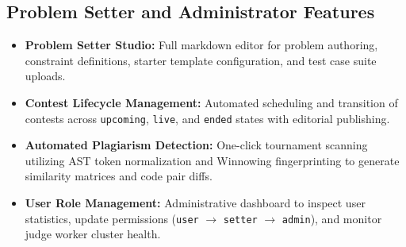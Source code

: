 \documentclass[12pt,a4paper]{report}
\begin{document}
\subsection{Problem Setter and Administrator Features}
\begin{itemize}[leftmargin=*]
  \item \textbf{Problem Setter Studio:} Full markdown editor for problem authoring, constraint definitions, starter template configuration, and test case suite uploads.
  \item \textbf{Contest Lifecycle Management:} Automated scheduling and transition of contests across \texttt{upcoming}, \texttt{live}, and \texttt{ended} states with editorial publishing.
  \item \textbf{Automated Plagiarism Detection:} One-click tournament scanning utilizing AST token normalization and Winnowing fingerprinting to generate similarity matrices and code pair diffs.
  \item \textbf{User Role Management:} Administrative dashboard to inspect user statistics, update permissions (\texttt{user} $\to$ \texttt{setter} $\to$ \texttt{admin}), and monitor judge worker cluster health.
\end{itemize}
\end{document}
